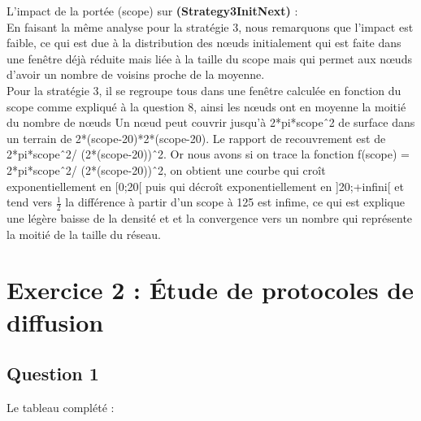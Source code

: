 \documentclass[10pt]{report}
\begin{document}
L'impact de la portée (scope) sur \textbf{(Strategy3InitNext)} :\\
En faisant la même analyse pour la stratégie 3, nous remarquons que l'impact est faible, ce qui est due à la distribution des nœuds initialement qui est faite dans une fenêtre déjà réduite mais liée à la taille du scope mais qui permet aux nœuds d'avoir un nombre de voisins proche de la moyenne.\\
Pour la stratégie 3, il se regroupe tous dans une fenêtre calculée en fonction du scope comme expliqué à la question 8, ainsi les nœuds ont en moyenne la moitié du nombre de nœuds
Un nœud peut couvrir jusqu’à 2*pi*scopeˆ2 de surface dans un terrain de 2*(scope-20)*2*(scope-20). Le rapport de recouvrement est de  2*pi*scopeˆ2/ (2*(scope-20))ˆ2. Or nous avons
si on trace la fonction f(scope) =  2*pi*scopeˆ2/ (2*(scope-20))ˆ2, on obtient une courbe qui croît exponentiellement en [0;20[ puis qui décroît exponentiellement en ]20;+infini[ et tend vers $\frac{1}{2}$ la différence à partir d’un scope à 125 est infime, ce qui est explique une légère baisse de la densité et et la convergence vers un nombre qui représente la moitié de la taille du réseau.
\newpage
\section{Exercice 2 : Étude de protocoles de diffusion}
\subsection{Question 1}

Le tableau complété :
\end{document}
